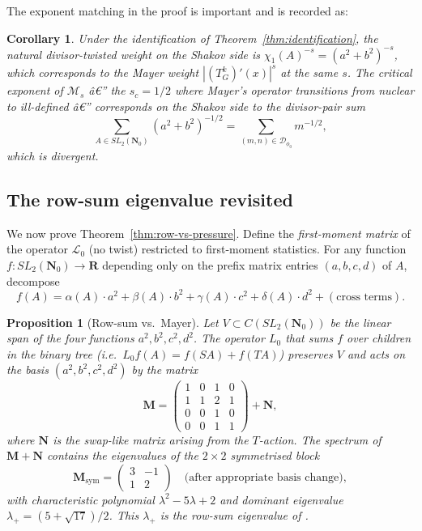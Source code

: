 ﻿\documentclass[11pt]{article}
\newtheorem{proposition}[theorem]{Proposition}
\newtheorem{corollary}[theorem]{Corollary}
\theoremstyle{definition}
\newcommand{\Nz}{\mathbf{N}_0}
\newcommand{\R}{\mathbf{R}}
\newcommand{\SLNz}{SL_2(\Nz)}
\newcommand{\Dphi}{\mathcal{D}_{\phi_0}}
\newcommand{\Lop}{\mathcal{L}}
\begin{document}
The exponent matching in the proof is important and is recorded as:

\begin{corollary}\label{cor:exponent}
Under the identification of Theorem~\ref{thm:identification}, the natural divisor-twisted weight on the Shakov side is $\chi_1(A)^{-s}=(a^2+b^2)^{-s}$, which corresponds to the Mayer weight $|(T_G^k)'(x)|^s$ at the same $s$. The critical exponent of $\mathcal{M}_s$ â€” the $s_c=1/2$ where Mayer's operator transitions from nuclear to ill-defined â€” corresponds on the Shakov side to the divisor-pair sum
\[
\sum_{A\in\SLNz}(a^2+b^2)^{-1/2} = \sum_{(m,n)\in\Dphi} m^{-1/2},
\]
which is divergent.
\end{corollary}

\subsection{The row-sum eigenvalue revisited}\label{sec:rowsum}

We now prove Theorem~\ref{thm:row-vs-pressure}. Define the \emph{first-moment matrix} of the operator $\Lop_0$ (no twist) restricted to first-moment statistics. For any function $f:\SLNz\to\R$ depending only on the prefix matrix entries $(a,b,c,d)$ of $A$, decompose
\[
f(A) = \alpha(A)\cdot a^2 + \beta(A)\cdot b^2 + \gamma(A)\cdot c^2 + \delta(A)\cdot d^2 + (\text{cross terms}).
\]

\begin{proposition}[Row-sum vs.\ Mayer]\label{prop:rowsum-vs-mayer}
Let $V\subset C(\SLNz)$ be the linear span of the four functions $a^2,b^2,c^2,d^2$. The operator $L_0$ that sums $f$ over children in the binary tree (i.e.\ $L_0 f(A) = f(SA)+f(TA)$) preserves $V$ and acts on the basis $(a^2,b^2,c^2,d^2)$ by the matrix
\[
\mathbf{M} = \begin{pmatrix}1&0&1&0\\1&1&2&1\\0&0&1&0\\0&0&1&1\end{pmatrix} + \mathbf{N},
\]
where $\mathbf{N}$ is the swap-like matrix arising from the $T$-action. The spectrum of $\mathbf{M}+\mathbf{N}$ contains the eigenvalues of the $2\times 2$ \emph{symmetrised} block
\[
\mathbf{M}_{\mathrm{sym}} = \begin{pmatrix}3&-1\\1&2\end{pmatrix}\quad\text{(after appropriate basis change)},
\]
with characteristic polynomial $\lambda^2-5\lambda+2$ and dominant eigenvalue $\lambda_+=(5+\sqrt{17})/2$. This $\lambda_+$ is the row-sum eigenvalue of \cite[Theorem~4.4]{shakov2024}.
\end{proposition}
\end{document}
